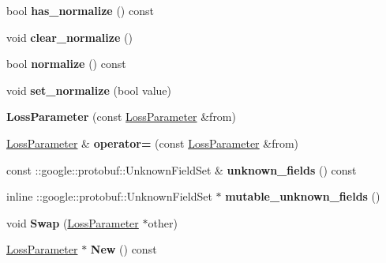 \begin{DoxyCompactItemize}
bool {\bfseries has\+\_\+normalize} () const
\item 
\mbox{\label{classcaffe_1_1_loss_parameter_a4c309b04458b8bbdd458933ef6cfd6a7}} 
void {\bfseries clear\+\_\+normalize} ()
\item 
\mbox{\label{classcaffe_1_1_loss_parameter_a70a0c209127e6f4b6de4a89b26a41bfc}} 
bool {\bfseries normalize} () const
\item 
\mbox{\label{classcaffe_1_1_loss_parameter_ab0af3efeaf1b62ab68548ad06f313b83}} 
void {\bfseries set\+\_\+normalize} (bool value)
\item 
\mbox{\label{classcaffe_1_1_loss_parameter_ac34546031057fb794965d000c7ed7061}} 
{\bfseries Loss\+Parameter} (const \mbox{\hyperlink{classcaffe_1_1_loss_parameter}{Loss\+Parameter}} \&from)
\item 
\mbox{\label{classcaffe_1_1_loss_parameter_ad2dc5e91ce7e0de59b25275f1ef6a31f}} 
\mbox{\hyperlink{classcaffe_1_1_loss_parameter}{Loss\+Parameter}} \& {\bfseries operator=} (const \mbox{\hyperlink{classcaffe_1_1_loss_parameter}{Loss\+Parameter}} \&from)
\item 
\mbox{\label{classcaffe_1_1_loss_parameter_a17717f040cab8bccc7c4a072152596b7}} 
const \+::google\+::protobuf\+::\+Unknown\+Field\+Set \& {\bfseries unknown\+\_\+fields} () const
\item 
\mbox{\label{classcaffe_1_1_loss_parameter_ae1b33bf6d3d2f3d79b36a49c7c092122}} 
inline \+::google\+::protobuf\+::\+Unknown\+Field\+Set $\ast$ {\bfseries mutable\+\_\+unknown\+\_\+fields} ()
\item 
\mbox{\label{classcaffe_1_1_loss_parameter_ace0b0e1aa8bf9d0b726c2c9d4218ed89}} 
void {\bfseries Swap} (\mbox{\hyperlink{classcaffe_1_1_loss_parameter}{Loss\+Parameter}} $\ast$other)
\item 
\mbox{\label{classcaffe_1_1_loss_parameter_a2cb382c4503968fd4992346d4e73ea28}} 
\mbox{\hyperlink{classcaffe_1_1_loss_parameter}{Loss\+Parameter}} $\ast$ {\bfseries New} () const

\end{DoxyCompactItemize}
